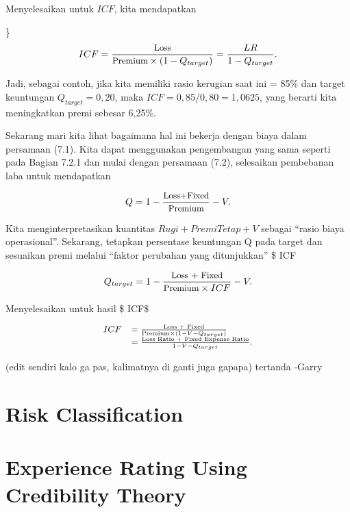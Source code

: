 \documentclass[
]{book}
\begin{document}
Menyelesaikan untuk \(ICF\), kita mendapatkan

\}\begin{equation}
\small{
ICF =  \frac{\text{Loss}}{\text{Premium} \times (1-Q_{target})} = \frac{LR}{1-Q_{target}}.
}
\end{equation}

Jadi, sebagai contoh, jika kita memiliki rasio kerugian saat ini = 85\% dan target keuntungan \(Q_{target} = 0,20\), maka \(ICF = 0,85/0,80 = 1,0625\), yang berarti kita meningkatkan premi sebesar 6,25\%.

Sekarang mari kita lihat bagaimana hal ini bekerja dengan biaya dalam persamaan (7.1). Kita dapat menggunakan pengembangan yang sama seperti pada Bagian 7.2.1 dan mulai dengan persamaan (7.2), selesaikan pembebanan laba untuk mendapatkan

\begin{equation}
\small{
Q = 1 - \frac{\text{Loss+Fixed}}{\text{Premium}} - V .
}
\end{equation}

Kita menginterpretasikan kuantitas \(Rugi + Premi Tetap + V\) sebagai ``rasio biaya operasional''. Sekarang, tetapkan persentase keuntungan Q pada target dan sesuaikan premi melalui ``faktor perubahan yang ditunjukkan'' \$ ICF

\begin{equation}
\small{
Q_{target} = 1
-\frac{\text{Loss + Fixed}}{\text{Premium}\times ICF} - V .
}
\end{equation}

Menyelesaikan untuk hasil \$ ICF\$

\begin{equation}
{\small
\begin{array}{ll}
ICF &= \frac{\text{Loss + Fixed}}{\text{Premium} \times (1 - V - Q_{target})} \\
&= \frac{\text{Loss Ratio + Fixed Expense Ratio}}{1 - V - Q_{target}} .
\end{array}
}
\end{equation}

(edit sendiri kalo ga pas, kalimatnya di ganti juga gapapa)
tertanda -Garry

\hypertarget{risk-classification}{%
\chapter{Risk Classification}\label{risk-classification}}

\hypertarget{experience-rating-using-credibility-theory}{%
\chapter{Experience Rating Using Credibility Theory}\label{experience-rating-using-credibility-theory}}
\end{document}
